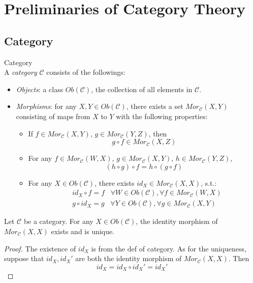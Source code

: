 \chapter{Preliminaries of Category Theory}

\section{Category}

\begin{definition}{Category}\\
A \textit{category} $\mathcal{C}$ consists of the followings:
\begin{itemize}
    \item \textit{Objects}: a class $Ob(\mathcal{C})$, the collection of all elements in $\mathcal{C}$.
    \item \textit{Morphisms}: for any $X,Y\in Ob(\mathcal{C})$, there exists a set $Mor_\mathcal{C} (X,Y)$ consisting of maps from $X$ to $Y$ with the following properties:
    \begin{itemize}
        \item If $f \in Mor_\mathcal{C}(X,Y)$, $g \in Mor_\mathcal{C}(Y,Z)$, then
        $$g \circ f \in Mor_\mathcal{C}(X,Z)$$
        \item For any $f \in Mor_\mathcal{C}(W,X)$, $g \in Mor_\mathcal{C}(X,Y)$, $h \in Mor_\mathcal{C}(Y,Z)$,
        $$(h \circ g) \circ f = h \circ (g \circ f)$$
        \item For any $X \in Ob(\mathcal{C})$, there exists $id_X \in Mor_\mathcal{C} (X,X)$, s.t.:
        \begin{align*}
            &id_X \circ f=f\;\;\;\forall W\in Ob(\mathcal{C}),\forall f \in Mor_\mathcal{C}(W,X)\\
            &g \circ id_X=g\;\;\;\forall Y\in Ob(\mathcal{C}),\forall g \in Mor_\mathcal{C}(X,Y)
        \end{align*}
    \end{itemize}
\end{itemize}
\end{definition}

\begin{proposition}
    Let $\mathcal{C}$ be a category. For any $X \in Ob(\mathcal{C})$, the identity morphism of $Mor_\mathcal{C}(X,X)$ exists and is unique.
\end{proposition}

\begin{proof}
    The existence of $id_X$ is from the def of category. As for the uniqueness, suppose that $id_X,id_X'$ are both the identity morphism of $Mor_\mathcal{C}(X,X)$. Then
    $$id_X = id_X \circ id_X' = id_X'$$
\end{proof}

